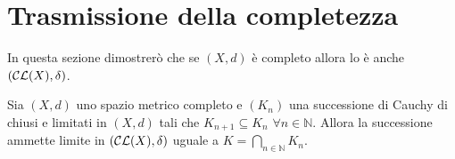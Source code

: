 \section{Trasmissione della completezza}



In questa sezione dimostrerò che se $(X,d)$ è completo allora lo è anche $(\mathcal{CL}(X),\delta) $.

\begin{lemma} \label {inglobati}
Sia $\left (X,d\right )$ uno spazio metrico completo e $\left (K_n \right )$ una successione di Cauchy di chiusi e limitati in $\left (X,d\right )$ tali che $K_{n+1}\subseteq K_n$ $ \forall n \in \mathbb{N}$. Allora la successione ammette limite in $\left (\mathcal{CL} (X),\delta\right  ) $ uguale a $ K=\bigcap_{n \in \mathbb{N}}K_n $.
\end{lemma}
